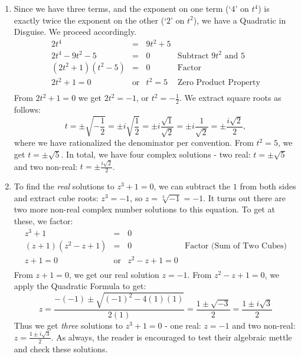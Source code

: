 \documentclass{ximera}
\begin{document}
\begin{exampleSol}
\begin{enumerate}
        \item  Since we have three terms, and the exponent on one term (`$4$' on $t^4$) is exactly twice the exponent on the other (`$2$' on $t^2$), we have a Quadratic in Disguise.  We proceed accordingly.
        \[ 
            \begin{array}{rclr}
                2t^4 & = & 9t^2 + 5 & \\
                2t^4 - 9t^2 - 5 & = & 0 & \text{Subtract $9t^2$ and $5$} \\
                (2t^2 + 1)(t^2 - 5) & = & 0 & \text{Factor} \\
                2t^2 + 1 = 0 & \text{or} & t^2 = 5 & \text{Zero Product Property} \\
            \end{array}
        \]  
        From $2t^2 + 1 = 0$ we get $2t^2 = -1$, or $t^2 = -\frac{1}{2}$.  We extract square roots as follows: 
        \[ 
            t = \pm \sqrt{-\dfrac{1}{2}} = \pm i \sqrt{\dfrac{1}{2}} = \pm i \dfrac{\sqrt{1}}{\sqrt{2}} = \pm i \dfrac{1}{\sqrt{2}} = \pm \dfrac{i \sqrt{2}}{2},
        \]
        where we have rationalized the denominator per convention.  From $t^2 = 5$, we get $t = \pm \sqrt{5}$. In total, we have four complex solutions - two real: $t = \pm \sqrt{5}$ and two non-real: $t = \pm \frac{i \sqrt{2}}{2}$.
        
        \item To find  the \textit{real} solutions to  $z^3 + 1 = 0$, we can subtract the $1$ from both sides and extract cube roots: $z^3 = -1$, so $z  = \sqrt[3]{-1} = -1$.  It turns out there are two more non-real complex number solutions to this equation.  To get at these, we factor:
        \[ 
            \begin{array}{rclr}
                z ^ 3 + 1 & = & 0 & \\
                (z + 1)(z^2 - z + 1) & = & 0 & \text{Factor (Sum of Two Cubes)} \\
                z + 1 = 0 & \text{or} & z^2 - z + 1 = 0 & \\
            \end{array} 
        \] 
        From $z+1 = 0$, we get our real solution $z = -1$.  From $z^2 -z + 1 = 0$, we apply the Quadratic Formula to get: 
        \[
            z = \dfrac{-(-1) \pm \sqrt{(-1)^2 - 4(1)(1)}}{2(1)} = \dfrac{1 \pm \sqrt{-3}}{2} = \dfrac{1 \pm i\sqrt{3}}{2} 
        \]
        Thus we get \textit{three} solutions to $z^3 + 1 = 0$ - one real: $z = -1$ and two non-real: $z =  \frac{1 \pm i\sqrt{3}}{2}$.  As always, the reader is encouraged to test their algebraic mettle and check these solutions.  	
    \end{enumerate}
\end{exampleSol}
\end{document}
